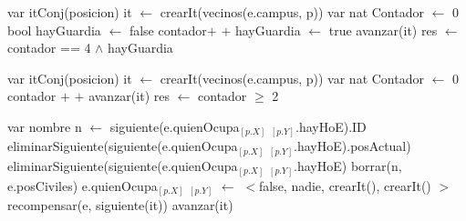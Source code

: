 \begin{algorithm}[H]
\begin{algorithmic}[1]
 
    \State var itConj(posicion) it $\gets$ crearIt(vecinos(e.campus, p))         	\State var nat Contador $\gets$ 0 
    \State bool hayGuardia $\gets$ false 
		 
			\State contador$+$ $+$ 
		\EndIf
		 
   			\State  hayGuardia $\gets$ true 
   		\EndIf
   		\State avanzar(it)	
   	\EndWhile
   	\State res $\gets$ contador == 4 $\wedge$ hayGuardia 
\EndFunction
\end{algorithmic}
\end{algorithm}

\begin{algorithm}[H]
\begin{algorithmic}[1]
 
    \State var itConj(posicion) it $\gets$ crearIt(vecinos(e.campus, p))         	\State var nat Contador $\gets$ 0 
     
    	 
    		\State contador $+$ $+$ 
    	\EndIf
    	\State avanzar(it)	
     \EndWhile
    \State res $\gets$ contador $\geqslant$ 2 
\EndFunction
\end{algorithmic}
\end{algorithm}

\begin{algorithm}[H]
\begin{algorithmic}[1]
 
    \State var nombre n $\gets$ siguiente(e.quienOcupa$_{[p.X]}$ $_{[p.Y]}$.hayHoE).ID 
    \State eliminarSiguiente(siguiente(e.quienOcupa$_{[p.X]}$ $_{[p.Y]}$.hayHoE).posActual) 
    \State eliminarSiguiente(siguiente(e.quienOcupa$_{[p.X]}$ $_{[p.Y]}$.hayHoE) 
    \State borrar(n, e.posCiviles) 
	\State e.quienOcupa$_{[p.X]}$ $_{[p.Y]}$ $\gets$ $<$false, nadie, crearIt(), crearIt() $>$ 
	  
    	 
    		\State recompensar(e, siguiente(it)) 
    	\EndIf
    	\State avanzar(it)	
     \EndWhile
\EndFunction
\end{algorithmic}
\end{algorithm}


